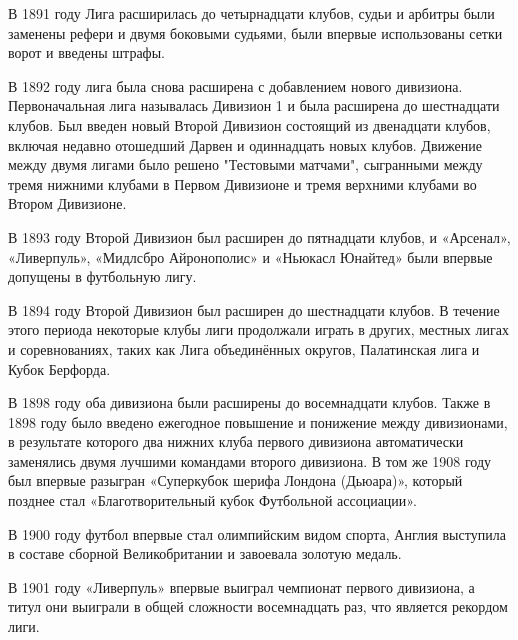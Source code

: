 В 1891 году Лига расширилась до четырнадцати клубов, судьи и арбитры были заменены рефери и двумя боковыми судьями, были впервые использованы сетки ворот и введены штрафы.

В 1892 году лига была снова расширена с добавлением нового дивизиона. Первоначальная лига называлась Дивизион 1 и была расширена до шестнадцати клубов. Был введен новый Второй Дивизион состоящий из двенадцати клубов, включая недавно отошедший Дарвен и одиннадцать новых клубов. Движение между двумя лигами было решено "Тестовыми матчами", сыгранными между тремя нижними клубами в Первом Дивизионе и тремя верхними клубами во Втором Дивизионе.

В 1893 году Второй Дивизион был расширен до пятнадцати клубов, и «Арсенал», «Ливерпуль», «Мидлсбро Айронополис» и «Ньюкасл Юнайтед» были впервые допущены в футбольную лигу.

В 1894 году Второй Дивизион был расширен до шестнадцати клубов. В течение этого периода некоторые клубы лиги продолжали играть в других, местных лигах и соревнованиях, таких как Лига объединённых округов, Палатинская лига и Кубок Берфорда.

В 1898 году оба дивизиона были расширены до восемнадцати клубов. Также в 1898 году было введено ежегодное повышение и понижение между дивизионами, в результате которого два нижних клуба первого дивизиона автоматически заменялись двумя лучшими командами второго дивизиона. В том же 1908 году был впервые разыгран «Суперкубок шерифа Лондона (Дьюара)», который позднее стал «Благотворительный кубок Футбольной ассоциации».

В 1900 году футбол впервые стал олимпийским видом спорта, Англия выступила в составе сборной Великобритании и завоевала золотую медаль.

В 1901 году «Ливерпуль» впервые выиграл чемпионат первого дивизиона, а титул они выиграли в общей сложности восемнадцать раз, что является рекордом лиги.

